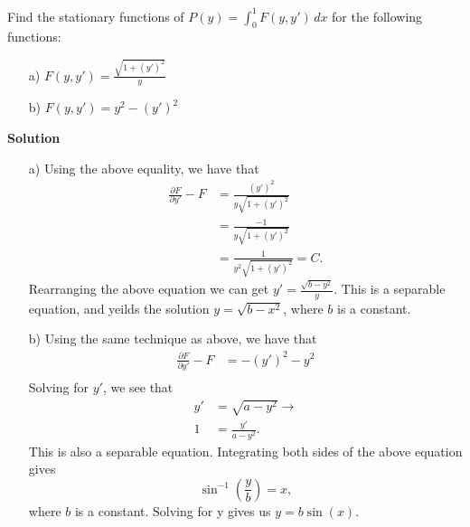 \begin{exercise}{2}
Find the stationary functions of $P(y) = \int_0^1F(y, y') \, dx$ for the following functions:
	\begin{enumerate}
		\item[a)] $F(y, y') = \frac{\sqrt{1 + (y')^2}}{y}$
		\item[b)] $F(y, y') = y^2 - (y')^2$
	\end{enumerate}

\textbf{Solution}

\begin{enumerate}
	\item[a)] Using the above equality, we have that 
	\begin{align*}
		\frac{\partial{F}}{\partial{y'}} - F &= \frac{(y')^2}{{y \sqrt{1 + (y')^2}}} \\
											 &= \frac{-1}{y \sqrt{1 + (y')^2}}  \\
											 &= \frac{1}{y^2 \sqrt{1 + (y')^2}} = C.
	\end{align*}
	Rearranging the above equation we can get $y' = \frac{\sqrt{b - y^2}}{y}$. This is a separable equation, and yeilds the solution $y = \sqrt{b - x^2}$, where $b$ is a constant.

	\item[b)] Using the same technique as above, we have that 
	\begin{align*}
		\frac{\partial{F}}{\partial{y'}} - F &= - (y')^2 - y^2\\
	\end{align*}
	Solving for $y'$, we see that 
	\begin{align*}
		y' &= \sqrt{a - y^2} \rightarrow \\
		1 &= \frac{y'}{a - y^2}.
	\end{align*}
	This is also a separable equation. Integrating both sides of the above equation gives 
		$$ \sin^{-1} (\frac{y}{b}) = x,$$
	where $b$ is a constant. Solving for y gives us $y = b \sin(x)$.

\end{enumerate}


\end{exercise}